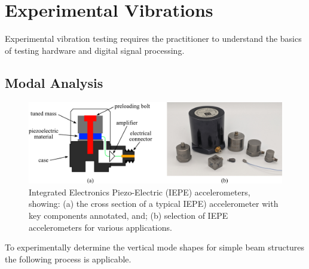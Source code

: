 \documentclass[12pt,letter]{article}
\numberwithin{ex}{section} %
\numberwithin{re}{section} %
\begin{document}
	
	\setcounter{section}{8}	
	\setcounter{figure}{0}   
	\renewcommand\thefigure{\thesection.\arabic{figure}}
	\setcounter{equation}{0}   
	\renewcommand\theequation{\thesection.\arabic{equation}}

	\section{Experimental Vibrations}
	
Experimental vibration testing requires the practitioner to understand the basics of testing hardware and digital signal processing.

\subsection{Modal Analysis}


\begin{figure}[H]
    \centering
    \includegraphics[]{figures/accelerometers.png}
    \caption{Integrated Electronics Piezo-Electric (IEPE) accelerometers, showing: (a) the cross section of a typical IEPE) accelerometer with key components annotated, and; (b) selection of IEPE accelerometers for various applications.}
    \label{fig:accelerometers}
\end{figure} 


To experimentally determine the vertical mode shapes for simple beam structures the following process is applicable. 
\end{document}
